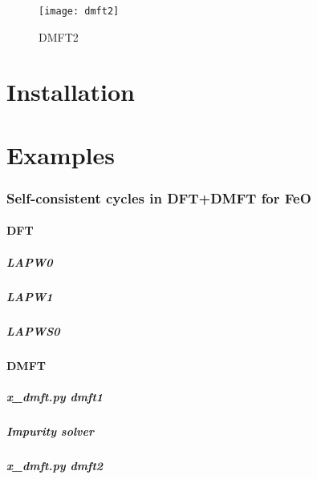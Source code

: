 \documentclass[12 pt]{article}
\begin{document}
{\begin{figure}
 \centering
 \texttt{[image: dmft2]}
 \caption{DMFT2}
 \label{DMFT2 figure}
\end{figure}





  \newpage
  \part{\large\textbf{Installation}}\label{part:installation}

  \newpage    
  \setcounter{section}{0}
  \part{\large\textbf{Examples}}\label{part:examples}
    \section{\textbf{Self-consistent cycles in DFT+DMFT for FeO}}\label{sec:self-consistent cycles}
      \subsection{DFT}\label{subsec:DFT}
	\subsubsection{LAPW0}\label{subsubsec:LAPW0}
	\subsubsection{LAPW1}\label{subsubsec:LAPW1}
	\subsubsection{LAPWS0}\label{subsubsec:LAPWS0}
      \subsection{DMFT}\label{subsec:DMFT}
	\subsubsection{x\_dmft.py dmft1}\label{subsubsec:dmft1}
	\subsubsection{Impurity solver}\label{subsubsec:impurity solver}
	\subsubsection{x\_dmft.py dmft2}\label{subsubsec:dmft2}
}
\end{document}
